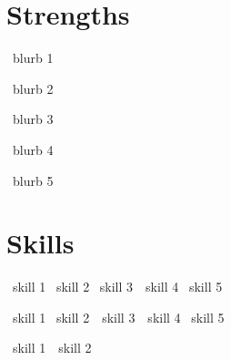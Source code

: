 \documentclass[letterpaper,12pt]{werner} %
\begin{document}
\begin{minipage}[t]{0.495\textwidth}

\section{Strengths}

\begin{minipage}[t]{\textwidth}

{} \lildot\, blurb 1\vspace{3pt}

{}\lildot\, blurb 2\vspace{3pt}

{}\lildot\, blurb 3\vspace{3pt}

{} \lildot\, blurb 4 \vspace{3pt}

{}\lildot\, blurb 5 

\end{minipage}

\end{minipage}
\hfill
\begin{minipage}[t]{0.480\textwidth}

\section{Skills}

\begin{minipage}[t]{\textwidth}

{} \lildot\, skill 1 \lildot\, skill 2 \lildot\, skill 3 \,\lildot\, skill 4 \lildot\, skill 5\vspace{6pt}

{} \lildot\, skill 1 \lildot\, skill 2 \,\lildot\, skill 3 \,\lildot\, skill 4 \lildot\, skill 5\vspace{6pt}

{} \lildot\, skill 1 \,\lildot\, skill 2

\end{minipage}

\end{minipage}

\vspace{8pt}
\sectionspace

\end{document}
